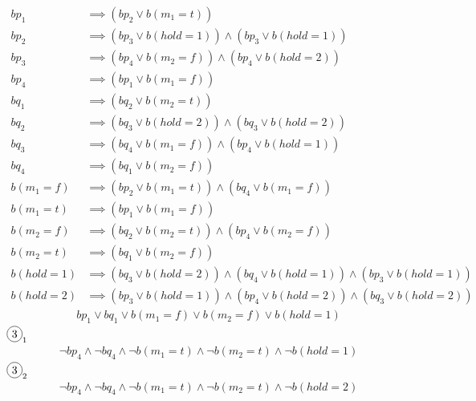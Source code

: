 \documentclass{scrartcl}
\newcommand*\circled[1]{\tikz[baseline=(char.base)]{
            \node[shape=circle,draw,inner sep=2pt] (char) {#1};}}
\begin{document}
\circled{1}
\begin{align*}
  bp_1 &\implies (bp_2 \lor b(m_1=t)) \\
  bp_2 &\implies (bp_3 \lor b(hold=1)) \land (bp_3 \lor b(hold=1)) \\
  bp_3 &\implies (bp_4 \lor b(m_2=f)) \land (bp_4 \lor b(hold=2)) \\
  bp_4 &\implies (bp_1 \lor b(m_1=f)) \\
  bq_1 &\implies (bq_2 \lor b(m_2=t)) \\
  bq_2 &\implies (bq_3 \lor b(hold=2)) \land (bq_3 \lor b(hold=2)) \\
  bq_3 &\implies (bq_4 \lor b(m_1=f)) \land (bp_4 \lor b(hold=1)) \\
  bq_4 &\implies (bq_1 \lor b(m_2=f)) \\
  b(m_1=f) &\implies (bp_2 \lor b(m_1=t)) \land (bq_4 \lor b(m_1=f)) \\
  b(m_1=t) &\implies (bp_1 \lor b(m_1=f)) \\
  b(m_2=f) &\implies (bq_2 \lor b(m_2=t)) \land (bp_4 \lor b(m_2=f)) \\
  b(m_2=t) &\implies (bq_1 \lor b(m_2=f)) \\
  b(hold=1) &\implies (bq_3 \lor b(hold=2)) \land (bq_4 \lor b(hold=1)) \land (bp_3 \lor b(hold=1)) \\
  b(hold=2) &\implies (bp_3 \lor b(hold=1)) \land (bp_4 \lor b(hold=2)) \land (bq_3 \lor b(hold=2))
\end{align*}
\circled{2}
\begin{align*}
  bp_1 \lor bq_1 \lor b(m_1=f) \lor b(m_2=f) \lor b(hold=1)
\end{align*}
$\circled{3}_1$
\begin{align*}
  \neg bp_4 \land \neg bq_4 \land \neg b(m_1=t) \land
  \neg b(m_2=t) \land \neg b(hold=1)
\end{align*}
$\circled{3}_2$
\begin{align*}
  \neg bp_4 \land \neg bq_4 \land \neg b(m_1=t) \land
  \neg b(m_2=t) \land \neg b(hold=2)
\end{align*}
\end{document}
